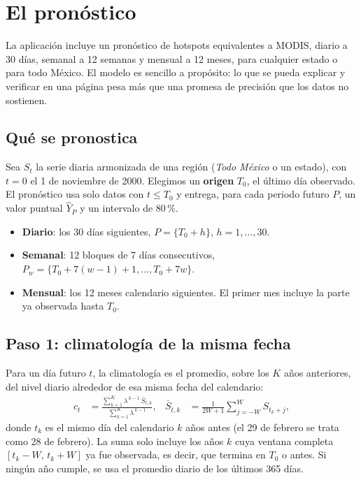 \chapter{El pronóstico}\label{cap:pron}

La aplicación incluye un pronóstico de hotspots equivalentes a MODIS, diario a 30 días, semanal a 12 semanas y mensual a 12 meses, para cualquier estado o para todo México. El modelo es sencillo a propósito: lo que se pueda explicar y verificar en una página pesa más que una promesa de precisión que los datos no sostienen.

\section{Qué se pronostica}

Sea $S_t$ la serie diaria armonizada de una región (\emph{Todo México} o un estado), con $t=0$ el 1 de noviembre de 2000. Elegimos un \textbf{origen} $T_0$, el último día observado. El pronóstico usa solo datos con $t\le T_0$ y entrega, para cada periodo futuro $P$, un valor puntual $\widehat Y_P$ y un intervalo de $80\,\%$.

\begin{itemize}
  \item \textbf{Diario}: los 30 días siguientes, $P=\{T_0+h\}$, $h=1,\dots,30$.
  \item \textbf{Semanal}: 12 bloques de 7 días consecutivos, $P_w=\{T_0+7(w-1)+1,\dots,T_0+7w\}$.
  \item \textbf{Mensual}: los 12 meses calendario siguientes. El primer mes incluye la parte ya observada hasta $T_0$.
\end{itemize}

\section{Paso 1: climatología de la misma fecha}

Para un día futuro $t$, la climatología es el promedio, sobre los $K$ años anteriores, del nivel diario alrededor de esa misma fecha del calendario:
\begin{align}
  c_t&=\frac{\sum_{k=1}^{K}\lambda^{\,k-1}\,\overline S_{t,k}}{\sum_{k=1}^{K}\lambda^{\,k-1}},&
  \overline S_{t,k}&=\frac{1}{2W+1}\sum_{j=-W}^{W}S_{t_k+j},\label{eq:clim}
\end{align}
donde $t_k$ es el mismo día del calendario $k$ años antes (el 29 de febrero se trata como 28 de febrero). La suma solo incluye los años $k$ cuya ventana completa $[t_k-W,\,t_k+W]$ ya fue observada, es decir, que termina en $T_0$ o antes. Si ningún año cumple, se usa el promedio diario de los últimos 365 días.

